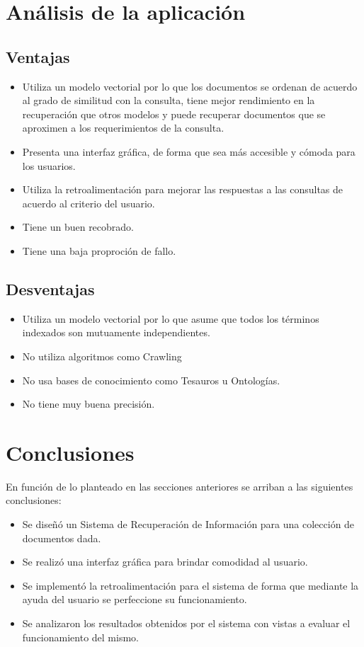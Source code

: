 \documentclass[runningheads]{llncs}
\begin{document}
\section{Análisis de la aplicación}
\subsection{Ventajas}
\begin{itemize}
\item Utiliza un modelo vectorial por lo que los documentos se ordenan de acuerdo al grado de similitud con la consulta, tiene mejor rendimiento en la recuperación que otros modelos y puede recuperar documentos que se aproximen a los requerimientos de la consulta.
\item Presenta una interfaz gráfica, de forma que sea más accesible y cómoda para los usuarios.
\item Utiliza la retroalimentación para mejorar las respuestas a las consultas de acuerdo al criterio del usuario.
\item Tiene un buen recobrado.
\item Tiene una baja proproción de fallo.
\end{itemize}
\subsection{Desventajas}
\begin{itemize}
\item Utiliza un modelo vectorial por lo que asume que todos los términos indexados son mutuamente independientes.
\item No utiliza algoritmos como Crawling
\item No usa bases de conocimiento como Tesauros u Ontologías.
\item No tiene muy buena precisión.
\end{itemize}

	\section{Conclusiones}
	En función de lo planteado en las secciones anteriores se arriban a las siguientes conclusiones:
	\begin{itemize}
	\item Se diseñó un Sistema de Recuperación de Información para una colección de documentos dada.
	\item Se realizó una interfaz gráfica para brindar comodidad al usuario.
	\item Se implementó la retroalimentación para el sistema de forma que mediante la ayuda del usuario se perfeccione su funcionamiento.
	\item Se analizaron los resultados obtenidos por el sistema con vistas a evaluar el funcionamiento del mismo.
	\end{itemize}
	
\end{document}
